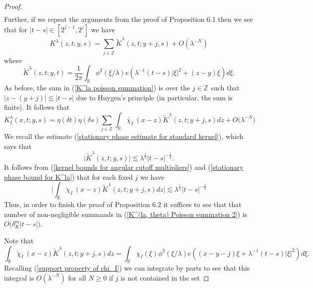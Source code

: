\documentclass[11pt]{amsart}
\numberwithin{equation}{section}
\newcommand{\la}{\lambda}
\newcommand{\Z}[1][]{\mathbb{Z}^#1}
\newcommand{\dK}[1]{\delta_{K}^{#1}}
\begin{document}
\begin{proof}
\begin{equation}
\begin{split}
\end{split}
\end{equation}
Further, if we repeat the arguments from the proof of Proposition 6.1 then we see that for $|t-s| \in [2^{j-1}, 2^j]$ we have
\begin{equation} \label{K^la poisson summation}
    K^{\la}(z,t; y, s) = \sum_{j \in \Z{}}\tilde{K}^{\la}(z,t;y+j,s) + O(\la^{-N})
\end{equation}
where
\begin{equation} \label{tilde K^la definition} 
    \tilde{K}^{\la}(z,t; y, t) = \frac{1}{2\pi} \int_{\mathbb{R}} \phi^2(\xi/\la)e(\la^{-1}(t-s)|\xi|^2 + (z-y) \xi)d\xi.
\end{equation}
As before, the sum in (\ref{K^la poisson summation}) is over the $j \in \Z{}$ such that $|z - (y + j)| \lesssim |t-s|$ due to Huygen's principle (in particular, the sum is finite). It follows that 
\begin{equation} \label{K^(la, theta) Poisson summation 2}
    K^{\la}_{I} (x,t;y,s) = \eta(\delta t) \eta(\delta s) \sum_{j \in \Z{}}\int_{\mathbb{R}} \check{\chi_{I}} \ (x - z)\tilde{K}^{\la}(z,t; y+ j, s) dz + O\big(\la^{-N}\big)
\end{equation}
We recall the estimate (\ref{stationary phase estimate for standard kernel}), which says that 
\begin{equation} \label{stationary phase bound for K^la}
    \big| \tilde{K}^{\la}(z,t;y,s)\big| \lesssim \la^{\frac{1}{2}}|t-s|^{-\frac{1}{2}}.
\end{equation}
It follows from (\ref{kernel bounds for angular cutoff multipliers}) and (\ref{stationary phase bound for K^la}) that for each fixed $j$ we have
\begin{equation}
    \Big|\int_{\mathbb{R}} \check{\chi}_{I} \ (x - z)\tilde{K}^{\la}(z,t; y+ j, s) dz\Big| \lesssim \la^{\frac{1}{2}}|t-s|^{-\frac{1}{2}}
\end{equation}
Thus, in order to finish the proof of Proposition 6.2 it suffices to see that that number of non-negligible summands in (\ref{K^(la, theta) Poisson summation 2}) is $O\big(\dK{m}|t-s|\big)$.
\par
Note that 
\begin{equation}
    \int_{\mathbb{R}} \check{\chi}_{I} \ (x - z)\tilde{K}^{\la}(z,t; y+ j, s) dz = \int_{\mathbb{R}} \chi_{I}(\xi)\phi^2(\xi/\la)e(( x-y-j) \xi + \la^{-1}(t-s)|\xi|^2)d\xi.
\end{equation}
Recalling (\ref{support property of chi_I}) we can integrate by parts to see that this integral is $O(\la^{-N})$ for all $N \geq 0$ if $j$ is not contained in the set

\end{proof}
\end{document}
